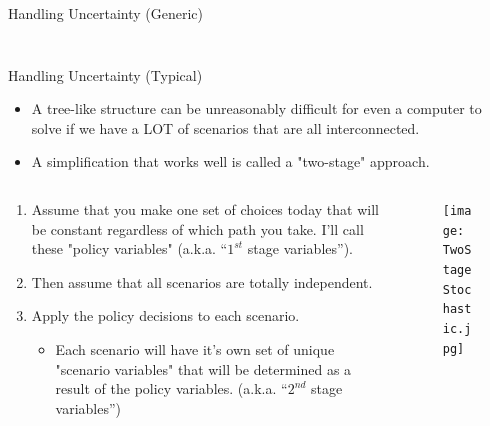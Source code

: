 \documentclass[10pt, aspectratio=169]{beamer}
\begin{document}
\begin{frame}{Handling Uncertainty (Generic)}
\begin{columns}
\begin{column}{0.5\textwidth}
\begin{figure}
            \end{figure}
        \end{column}
    \end{columns}
\end{frame}

\begin{frame}{Handling Uncertainty (Typical)}
    \begin{itemize}
        \item A tree-like structure can be unreasonably difficult for even a computer to solve if we have a LOT of scenarios that are all interconnected.
        \item A simplification that works well is called a "two-stage" approach.
    \end{itemize}
    \begin{columns}
        \begin{column}{0.5\textwidth}
            \begin{enumerate}
                \item Assume that you make one set of choices today that will be constant regardless of which path you take. I'll call these "policy variables" (a.k.a. \enquote{$1^{st}$ stage variables}).
                \item Then assume that all scenarios are totally independent.
                \item Apply the policy decisions to each scenario.
                \begin{itemize}
                    \item Each scenario will have it's own set of unique "scenario variables" that will be determined as a result of the policy variables. (a.k.a. \enquote{$2^{nd}$ stage variables})
                \end{itemize}
            \end{enumerate}
        \end{column}
        \begin{column}{0.5\textwidth}
            \begin{figure}
                \texttt{[image: TwoStageStochastic.jpg]}
            \end{figure}
        \end{column}
    \end{columns}
\end{frame}
\end{document}

